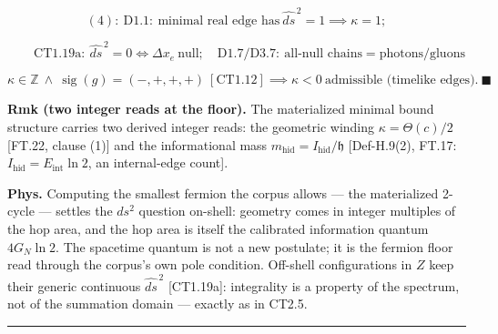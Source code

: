 \begin{theorem}
\[
(4):\ \mathrm{D1.1}:\ \text{minimal real edge has}\ \widehat{ds}^{\,2}=1\implies\kappa=1;
\]

\[
\qquad \mathrm{CT1.19a}:\ \widehat{ds}^{\,2}=0\iff\Delta x_e\ \text{null};\quad\mathrm{D1.7}/\mathrm{D3.7}:\ \text{all-null chains}=\text{photons/gluons}
\]

\[
\kappa\in\mathbb Z\ \wedge\ \operatorname{sig}(g)=(-,+,+,+)\ [\mathrm{CT1.12}]\implies\kappa<0\ \text{admissible (timelike edges)}.\ \blacksquare
\]

\textbf{Rmk (two integer reads at the floor).} The materialized minimal bound structure carries two derived integer reads: the geometric winding $\kappa=\Theta(c)/2$ [FT.22, clause (1)] and the informational mass $m_{\mathrm{hid}}=I_{\mathrm{hid}}/\mathfrak h$ [Def-H.9(2), FT.17: $I_{\mathrm{hid}}=E_{\mathrm{int}}\ln2$, an internal-edge count].

\textbf{Phys.} Computing the smallest fermion the corpus allows — the materialized 2-cycle — settles the $ds^2$ question on-shell: geometry comes in integer multiples of the hop area, and the hop area is itself the calibrated information quantum $4G_N\ln2$. The spacetime quantum is not a new postulate; it is the fermion floor read through the corpus's own pole condition. Off-shell configurations in $Z$ keep their generic continuous $\widehat{ds}^{\,2}$ [CT1.19a]: integrality is a property of the spectrum, not of the summation domain — exactly as in CT2.5.

\vspace{2pt}\noindent\rule{\textwidth}{0.4pt}\vspace{2pt}

\end{theorem}

